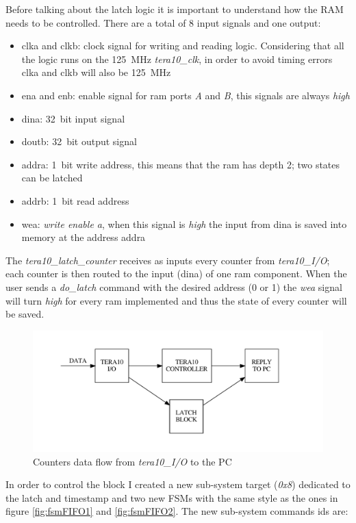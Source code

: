 \noindent Before talking about the latch logic it is important to understand how the RAM needs to be controlled. There are a total of 8 input signals and one output:
\begin{itemize}
	\item clka and clkb: clock signal for writing and reading logic. Considering that all the logic runs on the 125~MHz \textit{tera10\_clk}, in order to avoid timing errors clka and clkb will also be 125~MHz
	\item ena and enb: enable signal for ram ports \textit{A} and \textit{B}, this signals are always \textit{high}
	\item dina: 32~bit input signal
	\item doutb: 32~bit output signal
	\item addra: 1~bit write address, this means that the ram has depth 2; two states can be latched
	\item addrb: 1~bit read address
	\item wea: \textit{write enable a}, when this signal is \textit{high} the input from dina is saved into memory at the address addra
\end{itemize} 
\noindent The \textit{tera10\_latch\_counter} receives as inputs every counter from \textit{tera10\_I/O}; each counter is then routed to the input (dina) of one ram component. When the user sends a \textit{do\_latch} command with the desired address (0 or 1) the \textit{wea} signal will turn \textit{high} for every ram implemented and thus the state of every counter will be saved.
\begin{figure}[H]
	\centering
	\includegraphics[width=0.7\linewidth]{FSMdiagrams/latch_counter.pdf}
	\caption{Counters data flow from \textit{tera10\_I/O} to the PC}
	\label{fig:latch_counter}
\end{figure}
\noindent In order to control the block I created a new sub-system target (\textit{0x8}) dedicated to the latch and timestamp and two new FSMs with the same style as the ones in figure \ref{fig:fsmFIFO1} and \ref{fig:fsmFIFO2}. The new sub-system commands ids are:
